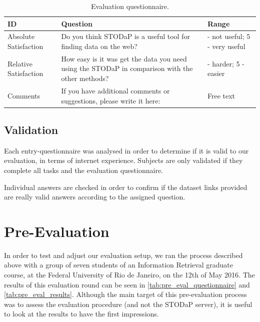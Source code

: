 \begin{table}[h]
\ABNTEXfontereduzida
\centering
\caption[Evaluation questionnaire.]{Evaluation questionnaire.}
\label{tab:eval_questionnaire}
\begin{tabular}{|>{\arraybackslash}m{3cm}|>{\arraybackslash}m{7cm}|>{\arraybackslash}m{5cm}|}
\hline
\centering\textbf{ID} & \centering\textbf{Question} & \centering\arraybackslash\textbf{Range} \\ \hline
Absolute Satisfaction & Do you think STODaP is a useful tool for finding data on the web? & 1 - not useful; 5 - very useful \\
Relative Satisfaction & How easy is it was get the data you need using the STODaP in comparison with the other methods? & 1 - harder; 5 - easier \\
Comments & If you have additional comments or suggestions, please write it here: & Free text \\
\hline
\end{tabular}
\end{table}

\subsection{Validation}
Each entry-questionnaire was analysed in order to determine if it is valid to our evaluation, in terms of internet experience.
Subjects are only validated if they complete all tasks and the evaluation questionnaire.

Individual answers are checked in order to confirm if the dataset links provided are really valid answers according to the assigned question.


\section{Pre-Evaluation}
\label{sec:pre_evaluation}

In order to test and adjust our evaluation setup, we ran the process described above with a group of seven students of an Information Retrieval graduate course, at the Federal University of Rio de Janeiro, on the 12th of May 2016.
The results of this evaluation round can be seen in \autoref{tab:pre_eval_questionnaire} and \autoref{tab:pre_eval_results}.
Although the main target of this pre-evaluation process was to assess the evaluation procedure (and not the STODaP server), it is useful to look at the results to have the first impressions.

